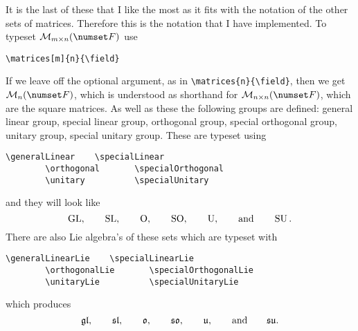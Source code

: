 \documentclass[fleqn, a4paper, openany]{memoir}
\begin{document}
    It is the last of these that I like the most as it fits with the notation of the other sets of matrices.
    Therefore this is the notation that I have implemented.
    To typeset \(\matrices[m]{n}{\field}\) use
    \begin{Verbatim}[gobble=2]
        \matrices[m]{n}{\field}
    \end{Verbatim}
    If we leave off the optional argument, as in \verb|\matrices{n}{\field}|, then we get \(\matrices{n}{\field}\), which is understood as shorthand for \(\matrices[n]{n}{\field}\), which are the square matrices.
    As well as these the following groups are defined: general linear group, special linear group, orthogonal group, special orthogonal group, unitary group, special unitary group.
    These are typeset using
    \begin{Verbatim}[gobble=2]
        \generalLinear    \specialLinear
        \orthogonal       \specialOrthogonal
        \unitary          \specialUnitary
    \end{Verbatim}
    and they will look like
    \begin{equation}
        \operatorname{GL}, \qquad \operatorname{SL}, \qquad \operatorname{O}, \qquad \operatorname{SO}, \qquad \operatorname{U}, \qquad\text{and}\qquad \operatorname{SU}.
    \end{equation}
    There are also Lie algebra's of these sets which are typeset with
    \begin{Verbatim}[gobble=2]
        \generalLinearLie    \specialLinearLie
        \orthogonalLie       \specialOrthogonalLie
        \unitaryLie          \specialUnitaryLie
    \end{Verbatim}
    which produces
    \begin{equation}
        \mathfrak{gl}, \qquad \mathfrak{sl}, \qquad \mathfrak{o}, \qquad \mathfrak{so}, \qquad \mathfrak{u}, \qquad\text{and}\qquad \mathfrak{su}.
    \end{equation}
    
\end{document}
